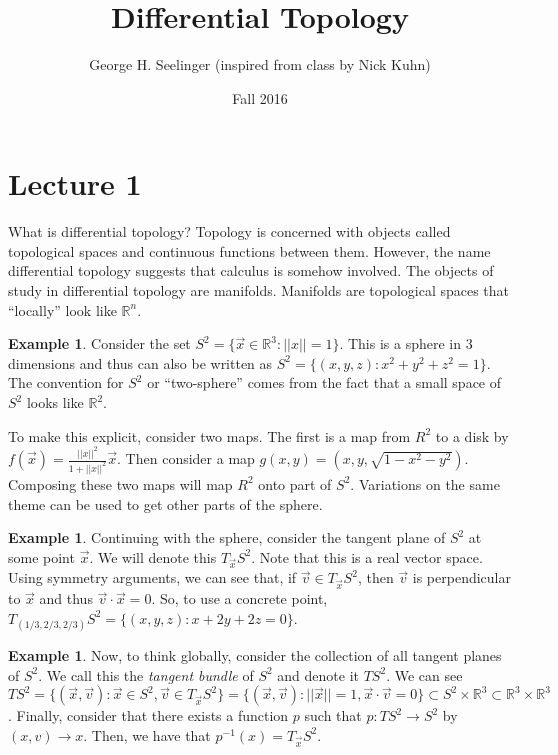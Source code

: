 \documentclass[11pt,leqno,oneside]{amsart}
\title[Differential Topology]{Differential Topology}
\author{George H. Seelinger (inspired from class by Nick Kuhn)}
\date{Fall 2016}
\newcommand{\R}{{\mathbb R}} %
\theoremstyle{definition}
\newtheorem{example}[thm]{Example}
\numberwithin{equation}{section}
\begin{document}
\maketitle
\section{Lecture 1}

What is differential topology? Topology is concerned with objects called
topological spaces and continuous functions between them. However, the name
differential topology suggests that calculus is somehow involved. The objects of
study in differential topology are manifolds. Manifolds are topological spaces
that ``locally'' look like $\R^n$.

\begin{example}
    Consider the set $S^2 = \{ \vec{x} \in \R^3: ||x||=1\}$. This is a sphere
    in 3 dimensions and thus can also be written as $S^2 = \{(x,y,z) :
    x^2+y^2+z^2=1\}$. The convention for $S^2$ or ``two-sphere'' comes from the
    fact that a small space of $S^2$ looks like $\R^2$.

    To make this explicit, consider two maps. The first is a map from $R^2$ to
    a disk by $f(\vec{x}) = \frac{||x||^2}{1+||x||^2} \vec{x}$. Then consider a
    map $g(x,y) = (x,y,\sqrt{1-x^2-y^2})$. Composing these two maps will map
    $R^2$ onto part of $S^2$. Variations on the same theme can be used to get
    other parts of the sphere.
\end{example}

\begin{example}
    Continuing with the sphere, consider the tangent plane of $S^2$ at some
    point $\vec{x}$. We will denote this $T_{\vec{x}}S^2$. Note that this is a
    real vector space. Using symmetry arguments, we can see that, if $\vec{v}
    \in T_{\vec{x}}S^2$, then $\vec{v}$ is perpendicular to $\vec{x}$ and thus
    $\vec{v} \cdot \vec{x} = 0$. So, to use a concrete point,
    $T_{(1/3,2/3,2/3)} S^2 = \{(x,y,z) : x+2y+2z=0\}$.
\end{example}
\begin{example}
    Now, to think globally, consider the collection of all tangent planes of
    $S^2$. We call this the \emph{tangent bundle} of $S^2$ and denote it
    $TS^2$. We can see $TS^2 = \{(\vec{x}, \vec{v}): \vec{x} \in S^2, \vec{v}
    \in T_{\vec{x}} S^2\} = \{(\vec{x},\vec{v}) : ||\vec{x}|| = 1, \vec{x}
    \cdot \vec{v} = 0\} \subset S^2 \times \R^3 \subset \R^3 \times \R^3$.
    Finally, consider that there exists a function $p$ such that $p: TS^2 \to
    S^2$ by $(x,v) \to x$. Then, we have that $p^{-1}(x) = T_{\vec{x}}S^2$.
\end{example}
\end{document}
